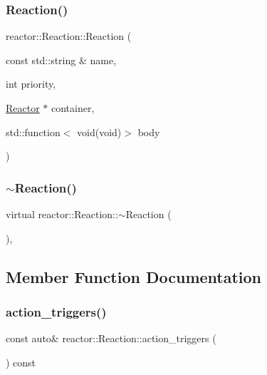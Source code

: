 \subsubsection{\texorpdfstring{Reaction()}{Reaction()}}
{\footnotesize\ttfamily reactor\+::\+Reaction\+::\+Reaction (\begin{DoxyParamCaption}\item[{const std\+::string \&}]{name,  }\item[{int}]{priority,  }\item[{\hyperlink{classreactor_1_1Reactor}{Reactor} $\ast$}]{container,  }\item[{std\+::function$<$ void(void)$>$}]{body }\end{DoxyParamCaption})}

\mbox{\label{classreactor_1_1Reaction_aa532060472706da66267b8a6ac6a88ad}} 
\subsubsection{\texorpdfstring{$\sim$\+Reaction()}{~Reaction()}}
{\footnotesize\ttfamily virtual reactor\+::\+Reaction\+::$\sim$\+Reaction (\begin{DoxyParamCaption}{ }\end{DoxyParamCaption})\hspace{0.3cm}{\ttfamily [inline]}, {\ttfamily [virtual]}}



\subsection{Member Function Documentation}
\mbox{\label{classreactor_1_1Reaction_a1f2f04c900ead25ec920bdede95fd8fd}} 
\subsubsection{\texorpdfstring{action\+\_\+triggers()}{action\_triggers()}}
{\footnotesize\ttfamily const auto\& reactor\+::\+Reaction\+::action\+\_\+triggers (\begin{DoxyParamCaption}{ }\end{DoxyParamCaption}) const\hspace{0.3cm}{\ttfamily [inline]}}

